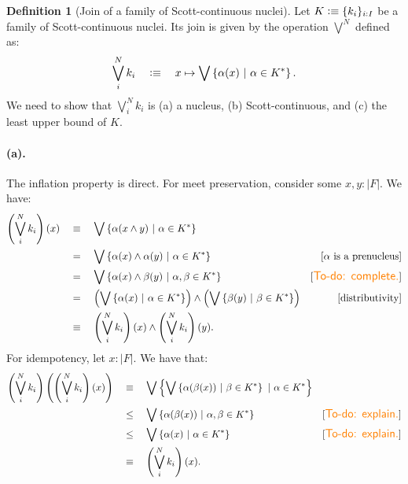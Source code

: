 \documentclass[a4paper, 11pt]{article}
\theoremstyle{definition}
\newtheorem{defn}{Definition}
\newcommand{\paren}[1]{\left( #1 \right)}
\newcommand{\setof}[1]{\left\{ #1 \right\}}
\newcommand{\is}{\vcentcolon\equiv}
\newcommand{\todo}[1]{{\large\color{orange}\textsf{To-do: #1.}}}
\begin{document}
\begin{defn}[Join of a family of Scott-continuous nuclei]
  Let $K \is \{ k_i \}_{i : I}$ be a family of Scott-continuous nuclei. Its join is given by
  the operation $\bigvee^N$ defined as:
  \begin{equation*}
    \bigvee^N_{i} k_i \quad\is\quad x \mapsto \bigvee \left\{ \alpha(x) ~|~ \alpha \in K^* \right\}.
  \end{equation*}
  We need to show that $\bigvee^N_{i} k_i$ is
    (a) a nucleus,
    (b) Scott-continuous, and
    (c) the least upper bound of $K$.

  \paragraph{(a).} The inflation property is direct. For meet preservation, consider some
  $x, y : | F |$. We have:
  \begin{align*}
    \left(\bigvee^N_{i} k_i\right)(x)
    &\quad\equiv\quad \bigvee \left\{ \alpha(x \wedge y) ~|~ \alpha \in K^* \right\} \\
    &\quad=\quad \bigvee \left\{ \alpha(x) \wedge \alpha(y) ~|~ \alpha \in K^* \right\}
          & [\text{$\alpha$ is a prenucleus}] \\
    &\quad=\quad \bigvee \left\{ \alpha(x) \wedge \beta(y) ~|~ \alpha, \beta \in K^* \right\}
          & [\text{\todo{complete}}] \\
    &\quad=\quad \paren{\bigvee \setof{ \alpha(x) ~|~ \alpha \in K^* }} \wedge \paren{\bigvee \setof{ \beta(y) ~|~ \beta \in K^* }}
          & [\text{distributivity}] \\
    &\quad\equiv\quad \paren{\bigvee^N_i k_i}(x) \wedge \paren{\bigvee^N_i k_i}(y).
  \end{align*}
  For idempotency, let $x : | F |$. We have that:
  \begin{align*}
    \left(\bigvee^N_{i} k_i\right)\left(\left(\bigvee^N_{i} k_i\right)(x)\right)
    &\quad\equiv\quad \bigvee \setof{ \bigvee \setof{ \alpha(\beta(x)) ~|~ \beta \in K^* } ~|~ \alpha \in K^* } \\
    &\quad\le\quad \bigvee \setof{ \alpha(\beta(x)) ~|~ \alpha, \beta \in K^* } & [\text{\todo{explain}}]\\
    &\quad\le\quad \bigvee \setof{ \alpha(x) ~|~ \alpha \in K^* } & [\text{\todo{explain}}]\\
    &\quad\equiv\quad \paren{\bigvee^N_i k_i}(x).
  \end{align*}


\end{defn}
\end{document}
